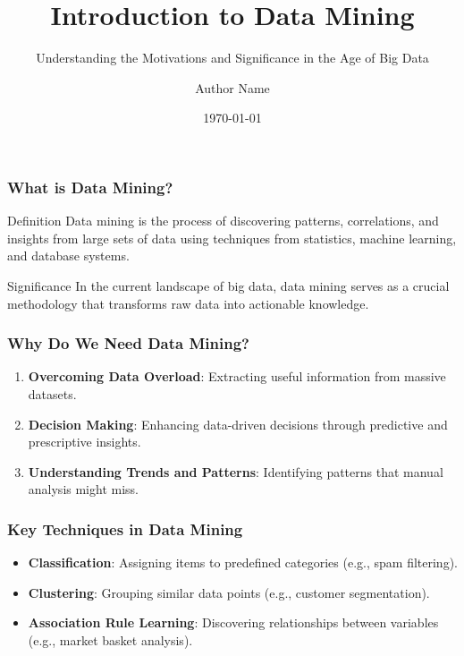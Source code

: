 \documentclass[aspectratio=169]{beamer}
\begin{document}
\frame{\titlepage}

\begin{frame}[fragile]
    \title{Introduction to Data Mining}
    \subtitle{Understanding the Motivations and Significance in the Age of Big Data}
    \author{Author Name}
    \date{\today}
    \maketitle
\end{frame}

\begin{frame}[fragile]
    \frametitle{What is Data Mining?}
    \begin{block}{Definition}
        Data mining is the process of discovering patterns, correlations, and insights from large sets of data using techniques from statistics, machine learning, and database systems. 
    \end{block}
    \begin{block}{Significance}
        In the current landscape of big data, data mining serves as a crucial methodology that transforms raw data into actionable knowledge.
    \end{block}
\end{frame}

\begin{frame}[fragile]
    \frametitle{Why Do We Need Data Mining?}
    \begin{enumerate}
        \item \textbf{Overcoming Data Overload}: Extracting useful information from massive datasets.
        \item \textbf{Decision Making}: Enhancing data-driven decisions through predictive and prescriptive insights.
        \item \textbf{Understanding Trends and Patterns}: Identifying patterns that manual analysis might miss.
    \end{enumerate}
\end{frame}

\begin{frame}[fragile]
    \frametitle{Key Techniques in Data Mining}
    \begin{itemize}
        \item \textbf{Classification}: Assigning items to predefined categories (e.g., spam filtering).
        \item \textbf{Clustering}: Grouping similar data points (e.g., customer segmentation).
        \item \textbf{Association Rule Learning}: Discovering relationships between variables (e.g., market basket analysis).
    \end{itemize}
\end{frame}
\end{document}
